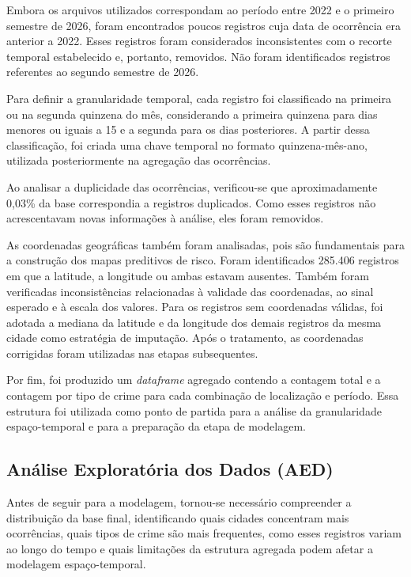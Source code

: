 \documentclass[12pt]{article}
\begin{document}
Embora os arquivos utilizados correspondam ao período entre 2022 e o primeiro semestre de 2026, foram encontrados poucos registros cuja data de ocorrência era anterior a 2022. Esses registros foram considerados inconsistentes com o recorte temporal estabelecido e, portanto, removidos. Não foram identificados registros referentes ao segundo semestre de 2026.

Para definir a granularidade temporal, cada registro foi classificado na primeira ou na segunda quinzena do mês, considerando a primeira quinzena para dias menores ou iguais a 15 e a segunda para os dias posteriores. A partir dessa classificação, foi criada uma chave temporal no formato quinzena-mês-ano, utilizada posteriormente na agregação das ocorrências.

Ao analisar a duplicidade das ocorrências, verificou-se que aproximadamente 0,03\% da base correspondia a registros duplicados. Como esses registros não acrescentavam novas informações à análise, eles foram removidos.

As coordenadas geográficas também foram analisadas, pois são fundamentais para a construção dos mapas preditivos de risco. Foram identificados 285.406 registros em que a latitude, a longitude ou ambas estavam ausentes. Também foram verificadas inconsistências relacionadas à validade das coordenadas, ao sinal esperado e à escala dos valores. Para os registros sem coordenadas válidas, foi adotada a mediana da latitude e da longitude dos demais registros da mesma cidade como estratégia de imputação. Após o tratamento, as coordenadas corrigidas foram utilizadas nas etapas subsequentes.

Por fim, foi produzido um \textit{dataframe} agregado contendo a contagem total e a contagem por tipo de crime para cada combinação de localização e período. Essa estrutura foi utilizada como ponto de partida para a análise da granularidade espaço-temporal e para a preparação da etapa de modelagem.

\vspace{1cm}

\subsection{Análise Exploratória dos Dados (AED)}

Antes de seguir para a modelagem, tornou-se necessário compreender a distribuição da base final, identificando quais cidades concentram mais ocorrências, quais tipos de crime são mais frequentes, como esses registros variam ao longo do tempo e quais limitações da estrutura agregada podem afetar a modelagem espaço-temporal.
\end{document}
